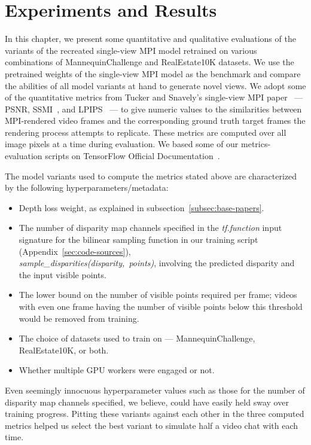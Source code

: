 \chapter{Experiments and Results}\label{ch4:experiments-results}

In this chapter, we present some quantitative and qualitative evaluations of the variants of the recreated single-view MPI model retrained on various combinations of MannequinChallenge and RealEstate10K datasets. We use the pretrained weights of the single-view MPI model as the benchmark and compare the abilities of all model variants at hand to generate novel views. We adopt some of the quantitative metrics from Tucker and Snavely's single-view MPI paper~\cite{single_view_mpi} --- PSNR, SSMI~\cite{wang_image_2004}, and LPIPS~\cite{zhang_unreasonable_2018} --- to give numeric values to the similarities between MPI-rendered video frames and the corresponding ground truth target frames the rendering process attempts to replicate. These metrics are computed over all image pixels at a time during evaluation. We based some of our metrics-evaluation scripts on TensorFlow Official Documentation~\cite{noauthor_tfimagepsnr_nodate,noauthor_tfimagessim_nodate}.

The model variants used to compute the metrics stated above are characterized by the following hyperparameters/metadata:
\begin{itemize}
    \item Depth loss weight, as explained in subsection~\ref{subsec:base-papers}.
    \item The number of disparity map channels specified in the \textit{tf.function} input signature for the bilinear sampling function in our training script (Appendix~\ref{sec:code-sources}),\\\textit{sample\_disparities(disparity,\ points)}, involving the predicted disparity and the input visible points.
    \item The lower bound on the number of visible points required per frame; videos with even one frame having the number of visible points below this threshold would be removed from training.
    \item The choice of datasets used to train on --- MannequinChallenge, RealEstate10K, or both.
    \item Whether multiple GPU workers were engaged or not.
\end{itemize}
Even seemingly innocuous hyperparameter values such as those for the number of disparity map channels specified, we believe, could have easily held sway over training progress. Pitting these variants against each other in the three computed metrics helped us select the best variant to simulate half a video chat with each time.

